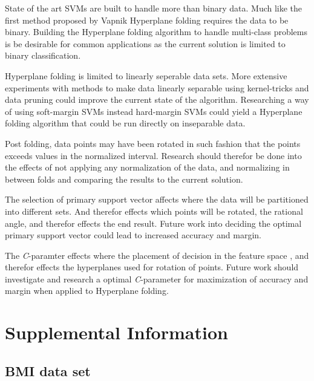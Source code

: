 \documentclass[a4paper,twoside]{bth}
\begin{document}
\par State of the art SVMs are built to handle more than binary data. Much like the first method proposed by Vapnik \cite{Cortes:1995:SN:218919.218929, vapnik1} Hyperplane folding requires the data to be binary. Building the Hyperplane folding algorithm to handle multi-class problems is be desirable for common applications as the current solution is limited to binary classification.

\par Hyperplane folding is limited to linearly seperable data sets. More extensive experiments with methods to make data linearly separable using kernel-tricks  and data pruning could improve the current state of the algorithm. Researching a way of using soft-margin SVMs instead hard-margin SVMs could yield a Hyperplane folding algorithm that could be run directly on inseparable data.


\par Post folding, data points may have been rotated in such fashion that the points exceeds values  in the normalized interval. Research should therefor be done into the effects of not applying any normalization of the data, and normalizing in between folds and comparing the results to the current solution.

\par The selection of primary support vector affects where the data will be partitioned into different sets. And therefor effects which points will be rotated, the rational angle, and therefor effects the end result. Future work into deciding the optimal primary support vector could lead to increased accuracy and margin. 

\par The \textit{C}-paramter effects where the placement of decision in the feature space \cite{Cortes:1995:SN:218919.218929}, and therefor effects the hyperplanes used for rotation of points. Future work should investigate and research a optimal \textit{C}-parameter for maximization of accuracy and margin when applied to Hyperplane folding. 





\appendix
\chapter{Supplemental Information}
\section{BMI data set}
\end{document}
